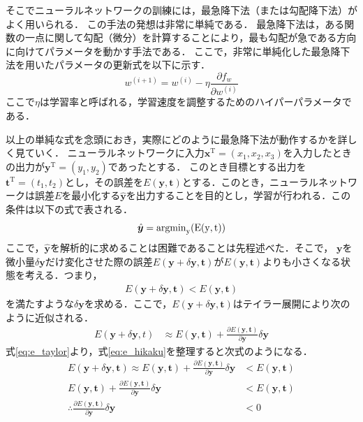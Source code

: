     そこでニューラルネットワークの訓練には，最急降下法\cite{cauchy1847methode}（または勾配降下法）がよく用いられる．
    この手法の発想は非常に単純である．
    最急降下法は，ある関数の一点に関して勾配（微分）を計算することにより，最も勾配が急である方向に向けてパラメータを動かす手法である．
    ここで，非常に単純化した最急降下法を用いたパラメータの更新式を以下に示す．
    \begin{equation}
        w^{(i+1)}=w^{(i)}-\eta\frac{\partial f_w}{\partial w^{(i)}}
    \end{equation}
    ここで$\eta$は学習率と呼ばれる，学習速度を調整するためのハイパーパラメータである．
    
    以上の単純な式を念頭におき，実際にどのように最急降下法が動作するかを詳しく見ていく．
    ニューラルネットワークに入力$\bm{x}^{\text{T}} = (x_{1}, x_{2}, x_{3})$を入力したときの出力が$\bm{y}^{\text{T}} = (y_{1}, y_{2})$であったとする．
    このとき目標とする出力を$\bm{t}^{\text{T}} = (t_{1}, t_{2})$とし，その誤差を$E(\bm{y}, \bm{t})$とする．このとき，ニューラルネットワークは誤差$E$を最小化する$\hat{\bm{y}}$を出力することを目的とし，学習が行われる．この条件は以下の式で表される．
    \begin{equation}
      \hat{\bm{y}} = \rm{argmin}_{\bm{y}}(E(\bm{y}, \bm{t}))
    \end{equation}
    ここで，$\hat{\bm{y}}$を解析的に求めることは困難であることは先程述べた．そこで，
    $\bm{y}$を微小量$\delta\bm{y}$だけ変化させた際の誤差$E(\bm{y}+\delta \bm{y}, \bm{t})$が$E(\bm{y}, \bm{t})$よりも小さくなる状態を考える．つまり，
    \begin{align}
      E (\bm{y} + \delta \bm{y}, \bm{t}) < E(\bm{y}, \bm{t}) 
      \label{eq:e_hikaku}
    \end{align}
    を満たすような$\delta\bm{y}$を求める．ここで，$E(\bm{y}+\delta \bm{y}, \bm{t})$はテイラー展開により次のように近似される．
    \begin{align}
      E(\bm{y}+\delta\bm{y}, t) &\approx E(\bm{y}, \bm{t}) + \frac{\partial E(\bm{y}, \bm{t})}{\partial \bm{y}} \delta \bm{y}
      \label{eq:e_taylor}
    \end{align}
    式\ref{eq:e_taylor}より，式\ref{eq:e_hikaku}を整理すると次式のようになる．
    \begin{align}
      E (\bm{y} + \delta \bm{y}, \bm{t}) \approx E(\bm{y}, \bm{t}) + \frac{\partial E(\bm{y}, \bm{t})}{\partial \bm{y}} \delta \bm{y} &< E (\bm{y}, \bm{t}) \nonumber \\
      E(\bm{y}, \bm{t}) + \frac{\partial E(\bm{y}, \bm{t})}{\partial \bm{y}} \delta \bm{y} &< E(\bm{y}, \bm{t}) \nonumber \\
      \therefore \frac{\partial E(\bm{y}, \bm{t})}{\partial \bm{y}} \delta \bm{y} &< 0
      \label{eq:e_back_jouken}
    \end{align}
